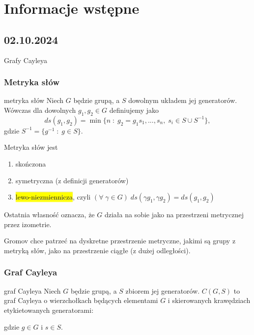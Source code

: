 \chapter{Informacje wstępne}

\section{02.10.2024}{Grafy Cayleya}

\subsection{Metryka słów}

\begin{definition}{metryka słów}{}
  Niech $G$ będzie grupą, a $S$ dowolnym układem jej generatorów. Wówczas dla dowolnych $g_1,g_2\in G$  definiujemy jako
$$ds(g_1, g_2)=\min\{n\;:\;g_2=g_1s_1,...,s_n,\;s_i\in S\cup S^{-1}\},$$
gdzie $S^{-1}=\{g^{-1}\;:\;g\in S\}$.
\end{definition}

Metryka słów jest 
\begin{enumerate}
  \item skończona
  \item symetryczna (z definicji generatorów)
  \item \hl{lewo-niezmiennicza}, czyli $(\forall\;\gamma\in G)\;ds(\gamma g_1,\gamma g_2)=ds(g_1, g_2)$
\end{enumerate}
Ostatnia własność oznacza, że $G$ działa na sobie jako na przestrzeni metrycznej przez izometrie.

Gromov chce patrzeć na dyskretne przestrzenie metryczne, jakimi są grupy z metryką słów, jako na przestrzenie ciągłe (z dużej odległości).

\subsection{Graf Cayleya}

\begin{definition}{graf Cayleya}{}
Niech $G$ będzie grupą, a $S$ zbiorem jej generatorów. $C(G, S)$ to graf Cayleya o wierzchołkach będących elementami $G$ i skierowanych krawędziach etykietowanych generatorami:
\begin{center}
\end{center}
gdzie $g\in G$ i $s\in S$.
\end{definition}

